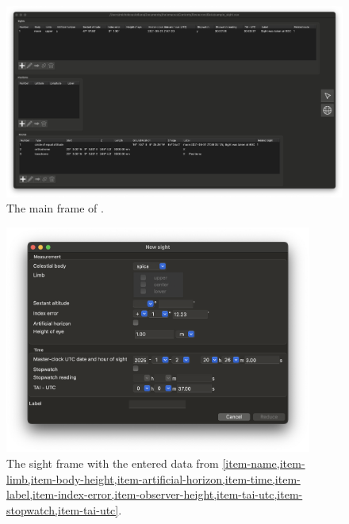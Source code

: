 \documentclass{ol-softwaremanual}
\begin{document}
\begin{figure}
  \centering
  \includegraphics[width=1\textwidth]{figures/list-frame.png}
  \caption{
    \label{fig-list-frame}
    The main frame of \thel. 
  }
  \end{figure}


  \begin{figure}
    \centering
    \includegraphics[width=0.9\textwidth]{figures/sight-frame.png}
    \caption{
      \label{fig-sight-frame}
      The sight frame with the entered data from \cref{item-name,item-limb,item-body-height,item-artificial-horizon,item-time,item-label,item-index-error,item-observer-height,item-tai-utc,item-stopwatch,item-tai-utc}. 
    }
  \end{figure}
  
\end{document}
